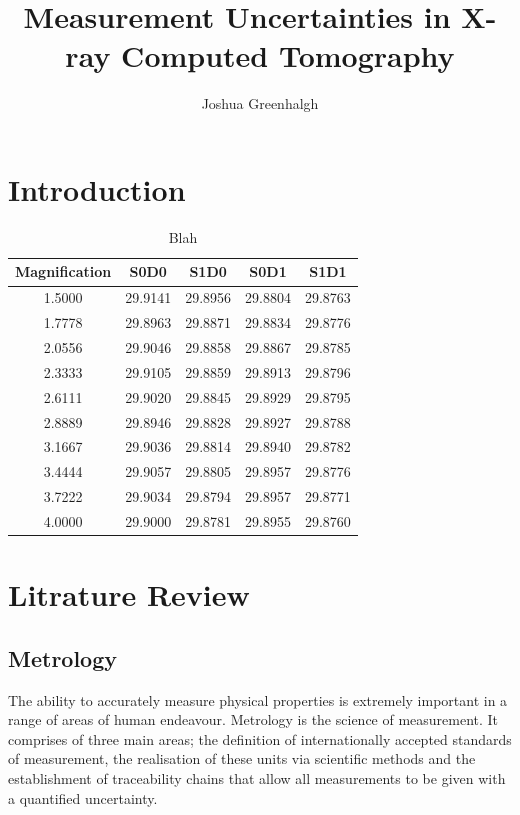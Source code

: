 \documentclass[
  twoside,
  11pt, a4paper,
  footinclude=true,
  headinclude=true,
  cleardoublepage=empty
]{scrbook}
\title{Measurement Uncertainties in X-ray Computed Tomography}
\author{Joshua Greenhalgh}
\begin{document}
\maketitle




\chapter{Introduction}

\begin{table}
\caption{Blah}
\begin{tabular}{c|cccc}
\toprule
{} Magnification &     S0D0 &     S1D0 &     S0D1 &     S1D1 \\
\midrule
1.5000        &  29.9141 &  29.8956 &  29.8804 &  29.8763 \\
1.7778        &  29.8963 &  29.8871 &  29.8834 &  29.8776 \\
2.0556        &  29.9046 &  29.8858 &  29.8867 &  29.8785 \\
2.3333        &  29.9105 &  29.8859 &  29.8913 &  29.8796 \\
2.6111        &  29.9020 &  29.8845 &  29.8929 &  29.8795 \\
2.8889        &  29.8946 &  29.8828 &  29.8927 &  29.8788 \\
3.1667        &  29.9036 &  29.8814 &  29.8940 &  29.8782 \\
3.4444        &  29.9057 &  29.8805 &  29.8957 &  29.8776 \\
3.7222        &  29.9034 &  29.8794 &  29.8957 &  29.8771 \\
4.0000        &  29.9000 &  29.8781 &  29.8955 &  29.8760 \\
\bottomrule
\end{tabular}
\end{table}

\chapter{Litrature Review}
\section{Metrology}
The ability to accurately measure physical properties is extremely important in a range of areas of human endeavour. Metrology is the science of measurement. It comprises of three main areas; the definition of internationally accepted standards of measurement, the realisation of these units via scientific methods and the establishment of traceability chains that allow all measurements to be given with a quantified uncertainty.
\end{document}
